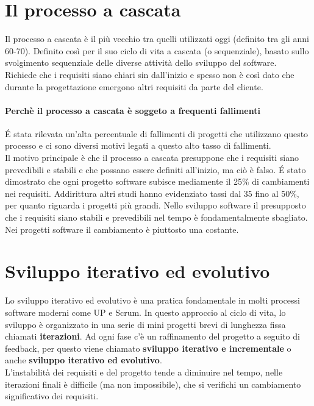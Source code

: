 \section{Il processo a cascata}
Il processo a cascata è il più vecchio tra quelli utilizzati oggi (definito tra gli
anni 60-70). Definito così per il suo ciclo di vita a cascata (o sequenziale),
basato sullo svolgimento sequenziale delle diverse attività dello sviluppo del software.
\\ Richiede che i requisiti siano chiari sin dall'inizio e spesso non è così dato
che durante la progettazione emergono altri requisiti da parte del cliente.
\paragraph{Perchè il processo a cascata è soggeto a frequenti fallimenti}
\'E stata rilevata un'alta percentuale di fallimenti di progetti che utilizzano questo processo
e ci sono diversi motivi legati a questo alto tasso di fallimenti.
\\ Il motivo principale è che il processo a cascata presuppone che i requisiti siano
prevedibili e stabili e che possano essere definiti all'inizio, ma ciò è falso.
\' E stato dimostrato che ogni progetto software subisce mediamente il 25\% di cambiamenti
nei requisiti. Addirittura altri studi hanno evidenziato tassi dal 35 fino al 50\%, per quanto
riguarda i progetti più grandi.
Nello sviluppo software il presupposto che i requisiti siano stabili e prevedibili nel tempo
è fondamentalmente sbagliato. Nei progetti software il cambiamento è piuttosto una
costante.
\section{Sviluppo iterativo ed evolutivo}
Lo sviluppo iterativo ed evolutivo è una pratica fondamentale in molti processi
software moderni come UP e Scrum. In questo approccio al ciclo di vita,
lo sviluppo è organizzato in una serie di mini progetti brevi di lunghezza fissa
chiamati \textbf{iterazioni}. Ad ogni fase c'è un raffinamento del progetto a seguito
di feedback, per questo viene chiamato \textbf{sviluppo iterativo e incrementale}
o anche \textbf{sviluppo iterativo ed evolutivo}.
\\ L'instabilità dei requisiti e del progetto tende a diminuire nel tempo, 
nelle iterazioni finali è difficile (ma non impossibile), che si verifichi un
cambiamento significativo dei requisiti.
